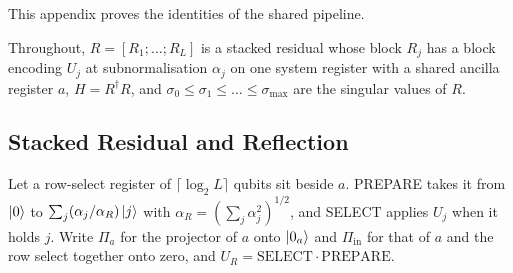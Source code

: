 %

This appendix proves the identities of the shared pipeline.

Throughout, $R=[R_1;\dots;R_L]$ is a stacked residual whose block $R_j$ has a block encoding $U_j$ at subnormalisation $\alpha_j$ on one system register with a shared ancilla register $a$, $H=R^\dagger R$, and $\sigma_0\le\sigma_1\le\dots\le\sigma_{\max}$ are the singular values of $R$.

\subsection{Stacked Residual and Reflection}
\label{app:proof-stacked-reflection}

Let a row-select register of $\lceil\log_2L\rceil$ qubits sit beside $a$. PREPARE takes it from $\ket0$ to $\sum_j(\alpha_j/\alpha_R)\ket j$ with $\alpha_R=(\sum_j\alpha_j^2)^{1/2}$, and SELECT applies $U_j$ when it holds $j$. Write $\Pi_a$ for the projector of $a$ onto $\ket{0_a}$ and $\Pi_{\mathrm{in}}$ for that of $a$ and the row select together onto zero, and $U_R=\mathrm{SELECT}\cdot\mathrm{PREPARE}$.

